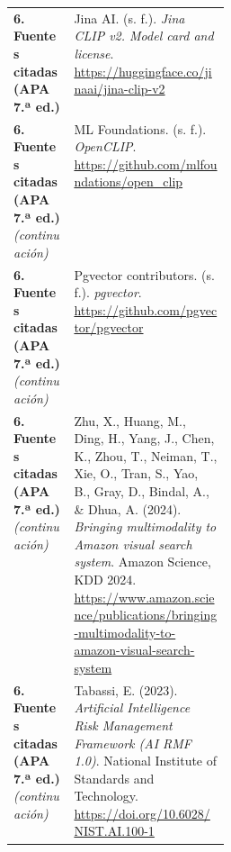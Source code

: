 \documentclass[11pt]{article}
\begin{document}
\begin{longtable}{@{}>{\raggedright\arraybackslash}p{0.28\linewidth}>{\raggedright\arraybackslash}p{}@{}}
\\
\midrule
\textbf{6. Fuentes citadas (APA 7.ª ed.)}\label{fuentes-citadas-apa-7.uxaa-ed.-2} &
Jina AI. (s. f.). \emph{Jina CLIP v2. Model card and license}. \url{https://huggingface.co/jinaai/jina-clip-v2}
\\
\textbf{6. Fuentes citadas (APA 7.ª ed.)} \emph{(continuación)} &
ML Foundations. (s. f.). \emph{OpenCLIP}. \url{https://github.com/mlfoundations/open_clip}
\\
\textbf{6. Fuentes citadas (APA 7.ª ed.)} \emph{(continuación)} &
Pgvector contributors. (s. f.). \emph{pgvector}. \url{https://github.com/pgvector/pgvector}
\\
\textbf{6. Fuentes citadas (APA 7.ª ed.)} \emph{(continuación)} &
Zhu, X., Huang, M., Ding, H., Yang, J., Chen, K., Zhou, T., Neiman, T., Xie, O., Tran, S., Yao, B., Gray, D., Bindal, A., \& Dhua, A. (2024). \emph{Bringing multimodality to Amazon visual search system}. Amazon Science, KDD 2024. \url{https://www.amazon.science/publications/bringing-multimodality-to-amazon-visual-search-system}
\\
\textbf{6. Fuentes citadas (APA 7.ª ed.)} \emph{(continuación)} &
Tabassi, E. (2023). \emph{Artificial Intelligence Risk Management Framework (AI RMF 1.0)}. National Institute of Standards and Technology. \url{https://doi.org/10.6028/NIST.AI.100-1}
\\


\end{longtable}
\end{document}
